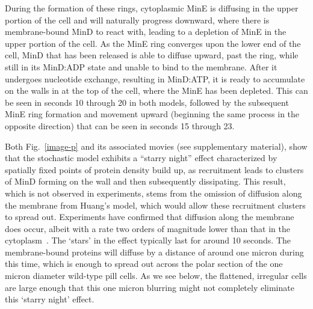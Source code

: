 \documentclass[10pt,letterpaper]{article}
\newcommand{\fixme}[1]{\red{[#1]}}
\newcommand{\red}[1]{{\bf \color{red} #1}}
\begin{document}
During the formation of these rings, cytoplasmic MinE is diffusing in
the upper portion of the cell and will naturally progress downward,
where there is membrane-bound MinD to react with, leading to a
depletion of MinE in the upper portion of the cell.  As the MinE ring
converges upon the lower end of the cell, MinD that has been released
is able to diffuse upward, past the ring, while still in its MinD:ADP
state and unable to bind to the membrane.  After it undergoes
nucleotide exchange, resulting in MinD:ATP, it is ready to accumulate
on the walls in at the top of the cell, where the MinE has been
depleted.  This can be seen in seconds 10 through 20 in both models,
followed by the subsequent MinE ring formation and movement upward
(beginning the same process in the opposite direction) that can be
seen in seconds 15 through 23.

Both Fig.~\ref{image-p} and its associated movies (see supplementary
material), show that the stochastic model exhibits a ``starry night''
effect characterized by spatially fixed points of protein density
build up, as recruitment leads to clusters of MinD forming on the wall
and then subsequently dissipating.  This result, which is not observed
in experiments, stems from the omission of diffusion along the
membrane from Huang's model, which would allow these recruitment
clusters to spread out.  Experiments have confirmed that diffusion
along the membrane does occur, albeit with a rate two orders of
magnitude lower than that in the cytoplasm~\cite{meacci2006mobility}.
The `stars' in the effect typically last for around 10 seconds. The
membrane-bound proteins will diffuse by a distance of around one
micron during this time, which is enough to spread out across the
polar section of the one micron diameter wild-type pill cells.  As we
see below, the flattened, irregular cells are large enough that this
one micron blurring might not completely eliminate this `starry night'
effect.

\end{document}
